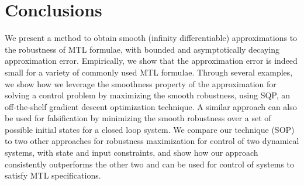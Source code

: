 \section{Conclusions}
We present a method to obtain smooth (infinity differentiable) approximations to the robustness of MTL formulae, with bounded and asymptotically decaying approximation error. 
Empirically, we show that the approximation error is indeed small for a variety of commonly used MTL formulae. 
Through several examples, we show how we leverage the smoothness property of the approximation for solving a control problem by maximizing the smooth robustness, using SQP, an off-the-shelf gradient descent optimization technique. A similar approach can also be used for falsification by minimizing the smooth robustness over a set of possible initial states for a closed loop system. We compare our technique (SOP) to two other approaches for robustness maximization for control of two dynamical systems, with state and input constraints, and show how our approach consistently outperforms the other two and can be used for control of systems to satisfy MTL specifications.

